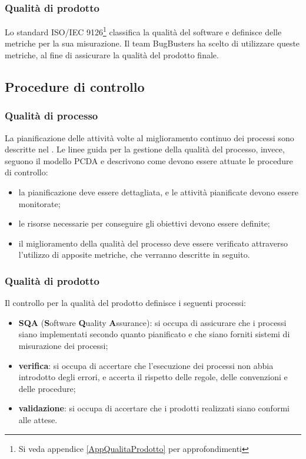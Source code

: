 \subsubsection{Qualità di prodotto}
Lo standard ISO/IEC 9126\footnote{Si veda appendice \ref{AppQualitaProdotto} per approfondimenti} classifica la qualità del software e definisce delle metriche per la sua misurazione. Il team BugBusters ha scelto di utilizzare queste metriche, al fine di assicurare la qualità del prodotto finale.

\subsection{Procedure di controllo}
\subsubsection{Qualità di processo}
La pianificazione delle attività volte al miglioramento continuo dei processi sono descritte nel \PianoDiProgetto. Le linee guida per la gestione della qualità del processo, invece, seguono il modello PCDA e descrivono come devono essere attuate le procedure di controllo:
\begin{itemize}
	\item la pianificazione deve essere dettagliata, e le attività pianificate devono essere monitorate;
	\item le risorse necessarie per conseguire gli obiettivi devono essere definite;
	\item il miglioramento della qualità del processo deve essere verificato attraverso l'utilizzo di apposite metriche, che verranno descritte in seguito.
\end{itemize}

\subsubsection{Qualità di prodotto}
Il controllo per la qualità del prodotto definisce i seguenti processi:
\begin{itemize}
	\item \textbf{SQA} (\textbf{S}oftware \textbf{Q}uality \textbf{A}ssurance): si occupa di assicurare che i processi siano implementati secondo quanto pianificato e che siano forniti sistemi di misurazione dei processi;
	\item \textbf{verifica}: si occupa di accertare che l'esecuzione dei processi non abbia introdotto degli errori, e accerta il rispetto delle regole, delle convenzioni e delle procedure;
	\item \textbf{validazione}: si occupa di accertare che i prodotti realizzati siano conformi alle attese.
\end{itemize}

